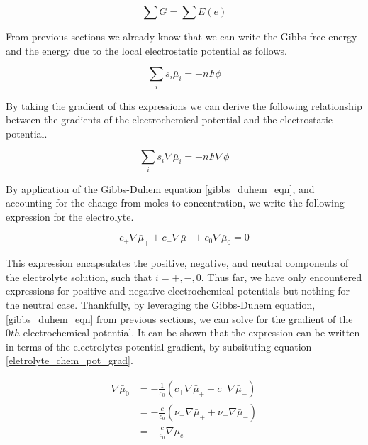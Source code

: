 \documentclass[lettersize,journal]{IEEEtran}
\begin{document}
\begin{equation}
  \sum{G} = \sum{E(e)}
\end{equation}

From previous sections we already know that we can write the Gibbs free energy and the energy due to the local electrostatic potential as follows.

\begin{equation}
\sum_{i} s_{i} \bar{\mu}_{i}=-n F \phi
\end{equation}

By taking the gradient of this expressions we can derive the following relationship between the gradients of the electrochemical potential and the electrostatic potential.

\begin{equation}\label{COE}
\sum_{i} s_{i} \nabla \bar{\mu}_{i}=-n F \nabla \phi
\end{equation}

By application of the Gibbs-Duhem equation \ref{gibbs_duhem_eqn}, and accounting for the change from moles to concentration, we write the following expression for the electrolyte.

\begin{equation}
c_{+} \nabla \bar{\mu}_{+}+c_{-} \nabla \bar{\mu}_{-}+c_{0} \nabla \bar{\mu}_{0}=0
\end{equation}

This expression encapsulates the positive, negative, and neutral components of the electrolyte solution, such that $i = +, -, 0$. Thus far, we have only encountered expressions for positive and negative electrochemical potentials but nothing for the neutral case. Thankfully, by leveraging the Gibbs-Duhem equation, \ref{gibbs_duhem_eqn} from previous sections, we can solve for the gradient of the $0th$ electrochemical potential. It can be shown that the expression can be written in terms of the electrolytes potential gradient, by subsituting equation \ref{eletrolyte_chem_pot_grad}.

\begin{equation}
\begin{aligned}
\nabla \bar{\mu}_{0} &=-\frac{1}{c_{0}}\left(c_{+} \nabla \bar{\mu}_{+}+c_{-} \nabla \bar{\mu}_{-}\right) \\
&=-\frac{c}{c_{0}}\left(\nu_{+} \nabla \bar{\mu}_{+}+\nu_{-} \nabla \bar{\mu}_{-}\right) \\
&=-\frac{c}{c_{0}} \nabla \mu_{e}
\end{aligned}
\end{equation}
\end{document}
